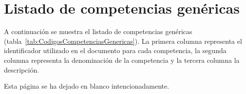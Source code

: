 \chapter{Listado de competencias genéricas} \label{Ap:Competencias}

A continuación se muestra el listado de competencias genéricas (tabla~\ref{tab:CodigosCompetenciasGenericas}). La primera columna representa el identificador utilizado en el documento para cada competencia, la segunda columna representa la denominación de la competencia y la tercera columna la descripción.

\newpage

{\vspace*{\fill}
{\centering Esta página se ha dejado en blanco intencionadamente.\par}
\vspace{\fill}}

\newpage

